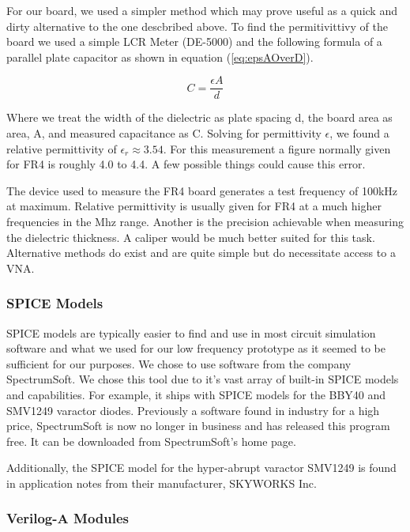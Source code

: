 \documentclass[journal]{IEEEtran} \usepackage[english]{babel}
\begin{document}
For our board, we used a simpler method which may prove useful as a quick and
dirty alternative to the one descbribed above. To find the permitivittivy of the
board we used a simple LCR Meter (DE-5000) and the following formula of a
parallel plate capacitor as shown in equation (\ref{eq:epsAOverD}).



\begin{equation}\label{eq:epsAOverD}
	C =\frac{ \epsilon{}A }{d}
\end{equation}

Where we treat the width of the dielectric as plate spacing d, the board area
as area, A, and measured capacitance as C. Solving for permittivity
$\epsilon$, we found a relative permittivity of $\epsilon_{r}\approx 3.54$.
For this measurement a figure normally given for FR4 is roughly 4.0 to 4.4. A
few possible things could cause this error. 

The device used to measure the FR4 board generates a test frequency of 100kHz at
maximum. Relative permittivity is usually given for FR4 at a much higher
frequencies in the Mhz range. Another is the precision achievable when measuring
the dielectric thickness. A caliper would be much better suited for this task.
Alternative methods do exist and are quite simple but do necessitate access to a
VNA\cite{SimpleRelative}.



    
\subsubsection{SPICE Models}

SPICE models are typically easier to find and use in most circuit simulation
software and what we used for our low frequency prototype as it seemed to be
sufficient for our purposes. We chose to use software from the company
SpectrumSoft. We chose this tool due to it's vast array of built-in SPICE models
and capabilities. For example, it ships with SPICE models for the BBY40 and
SMV1249 varactor diodes. Previously a software found in industry for a high
price, SpectrumSoft is now no longer in business and has released this program
free. It can be downloaded from SpectrumSoft's home page.


Additionally, the SPICE model for the hyper-abrupt varactor SMV1249 is found in
application notes from their manufacturer, SKYWORKS Inc.




\subsubsection{Verilog-A Modules}
\end{document}
